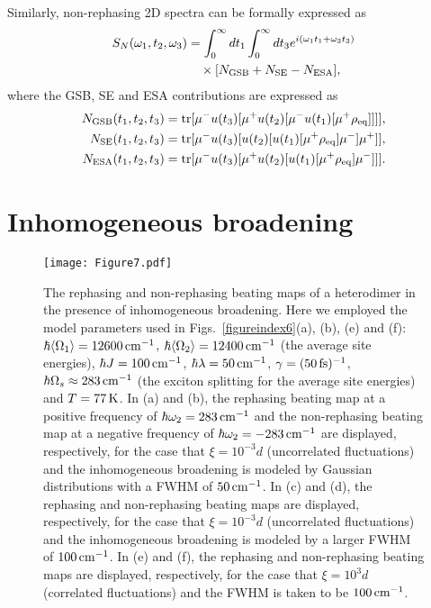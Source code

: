 \documentclass[%
 reprint,%
 amssymb, amsmath,%
 aip,cha,%
]{revtex4-1}
\begin{document}
Similarly, non-rephasing 2D spectra can be formally expressed as
\begin{align}
S_{N}(\omega_1,t_2,\omega_3)&=\int_{0}^{\infty}dt_{1}\int_{0}^{\infty}dt_{3}e^{i(\omega_1 t_1+\omega_3 t_3)}\\
&\quad\times[N_{\rm GSB}+N_{\rm SE}-N_{\rm ESA}],\nonumber
\end{align}
where the GSB, SE and ESA contributions are expressed as
\begin{align}
N_{\rm GSB}(t_1,t_2,t_3)&={\rm tr}[\mu^{-}u(t_3)[\mu^{+}u(t_2)[\mu^{-}u(t_1)[\mu^{+}\rho_{\rm eq}]]]],\\
N_{\rm SE}(t_1,t_2,t_3)&={\rm tr}[\mu^{-}u(t_3)[u(t_2)[u(t_1)[\mu^{+}\rho_{\rm eq}]\mu^{-}]\mu^{+}]],\\
N_{\rm ESA}(t_1,t_2,t_3)&={\rm tr}[\mu^{-}u(t_3)[\mu^{+}u(t_2)[u(t_1)[\mu^{+}\rho_{\rm eq}]\mu^{-}]]].
\end{align}

\section{Inhomogeneous broadening}

\begin{figure*}[ht!]
	\texttt{[image: Figure7.pdf]}
	\caption{The rephasing and non-rephasing beating maps of a heterodimer in the presence of inhomogeneous broadening. Here we employed the model parameters used in Figs.~\ref{figureindex6}(a), (b), (e) and (f): $\hbar\mathrm{\left\langle\Omega_1\right\rangle}=12600\,{\rm cm}^{-1}$, $\hbar\mathrm{\left\langle\Omega_2\right\rangle}=12400\,{\rm cm}^{-1}$ (the average site energies), $\hbar J=100\,{\rm cm}^{-1}$, $\hbar\lambda=50\,{\rm cm}^{-1}$, $\gamma=(50\,{\rm fs})^{-1}$, $\hbar\Omega_s\approx 283\,{\rm cm}^{-1}$ (the exciton splitting for the average site energies) and $T=77\,{\rm K}$. In (a) and (b), the rephasing beating map at a positive frequency of $\hbar\omega_2=283\,{\rm cm}^{-1}$ and the non-rephasing beating map at a negative frequency of $\hbar\omega_2=-283\,{\rm cm}^{-1}$ are displayed, respectively, for the case that $\xi=10^{-3}d$ (uncorrelated fluctuations) and the inhomogeneous broadening is modeled by Gaussian distributions with a FWHM of $50\,{\rm cm}^{-1}$. In (c) and (d), the rephasing and non-rephasing beating maps are displayed, respectively, for the case that $\xi=10^{-3}d$ (uncorrelated fluctuations) and the inhomogeneous broadening is modeled by a larger FWHM of $100\,{\rm cm}^{-1}$. In (e) and (f),  the rephasing and non-rephasing beating maps are displayed, respectively, for the case that $\xi=10^{3}d$ (correlated fluctuations) and the FWHM is taken to be $100\,{\rm cm}^{-1}$.}
	\label{figureindex7} 
\end{figure*}
\end{document}
